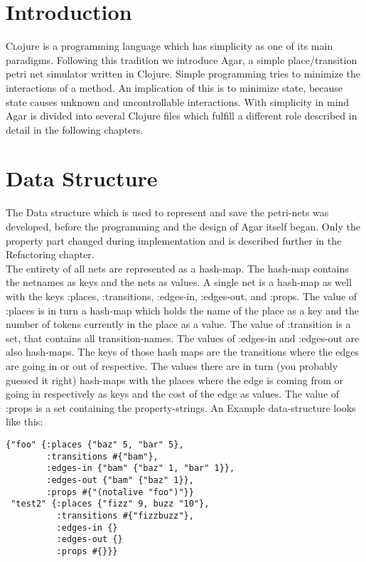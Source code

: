 \documentclass[twoside]{article}
\begin{document}
\begin{multicols}{2} %

\section{Introduction}

\lettrine[nindent=0em,lines=3]{C} lojure is a programming language which has simplicity as one of its main paradigms.
Following this tradition we introduce Agar, a simple place/transition petri net simulator written in Clojure.
Simple programming tries to minimize the interactions of a method. An implication of this is to minimize
state, because state causes unknown and uncontrollable interactions.
With simplicity in mind Agar is divided into several Clojure files which fulfill a different role described in detail 
in the following chapters. 


\section{Data Structure}
The Data structure which is used to represent and save the petri-nets was developed, before the programming and
the design of Agar itself began. Only the property part changed during implementation and is described further
in the Refactoring chapter.\\
The entirety of all nets are represented as a hash-map. The hash-map contains the netnames as keys and the nets as values.
A single net is a hash-map as well with the keys :places, :transitions, :edges-in, :edges-out, and :props.
The value of :places is in turn a hash-map which holds the name of the place as a key and the number of tokens currently
in the place as a value.
The value of :transition is a set, that contains all transition-names. 
The values of :edges-in and :edges-out are also hash-maps. The keys of those hash maps are the transitions where the edges are going in or
out of respective. The values there are in turn (you probably guessed it right) hash-maps with the places where
the edge is coming from or going in respectively as keys and the cost of the edge as values.
The value of :props is a set containing the property-strings.
An Example data-structure looks like this:
\begin{verbatim}
{"foo" {:places {"baz" 5, "bar" 5}, 
		:transitions #{"bam"}, 
		:edges-in {"bam" {"baz" 1, "bar" 1}}, 
		:edges-out {"bam" {"baz" 1}}, 
		:props #{"(notalive "foo")"}}
 "test2" {:places {"fizz" 9, buzz "10"},
 		  :transitions #{"fizzbuzz"},
 		  :edges-in {}
 		  :edges-out {}
 		  :props #{}}}
\end{verbatim}


\end{multicols}
\end{document}
